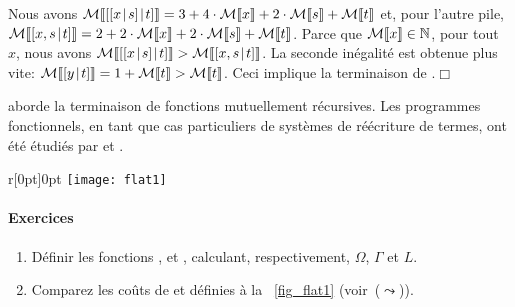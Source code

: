 Nous avons \(\mathcal{M}\llbracket{[{[{x}\!\mid\!{s}]}\!\mid\!{t}]}\rrbracket = 3 + 4\cdot\mathcal{M}\llbracket{x}\rrbracket +
2\cdot\mathcal{M}\llbracket{s}\rrbracket + \mathcal{M}\llbracket{t}\rrbracket\) et, pour l'autre pile,
\(\mathcal{M}\llbracket{[{x,s}\!\mid\!{t}]}\rrbracket = 2 + 2\cdot\mathcal{M}\llbracket{x}\rrbracket + 2\cdot\mathcal{M}\llbracket{s}\rrbracket
+ \mathcal{M}\llbracket{t}\rrbracket\). Parce que \(\mathcal{M}\llbracket{x}\rrbracket \in \mathbb{N}\), pour
tout~\(x\), nous avons \(\mathcal{M}\llbracket{[{[{x}\!\mid\!{s}]}\!\mid\!{t}]}\rrbracket >
\mathcal{M}\llbracket{[{x,s}\!\mid\!{t}]}\rrbracket\). La seconde inégalité est obtenue plus vite:
\(\mathcal{M}\llbracket{[{y}\!\mid\!{t}]}\rrbracket = 1 + \mathcal{M}\llbracket{t}\rrbracket > \mathcal{M}\llbracket{t}\rrbracket\). Ceci
implique la terminaison de
.\hfill\(\Box\)

\cite{Giesl_1997} aborde la terminaison de fonctions mutuellement
récursives. Les programmes fonctionnels, en tant que cas particuliers
de systèmes de réécriture de termes, ont été étudiés par
\cite{Giesl_1995b} et \cite{GieslWaltherBrauburger_1998}.

%
\begin{wrapfigure}[6]{r}[0pt]{0pt}
\centering
\texttt{[image: flat1]}
\caption{Aplatissement alternatif\label{fig_flat1}
}
\end{wrapfigure}
\paragraph{Exercices}

\begin{enumerate}

  \item Définir les fonctions ,  et
    , calculant, respectivement, \(\Omega\), \(\Gamma\)
    et \(L\).

  \item Comparez les coûts de  et
      définies à la
    \fig~\ref{fig_flat1} (voir~(\(\leadsto\))).

\end{enumerate}
